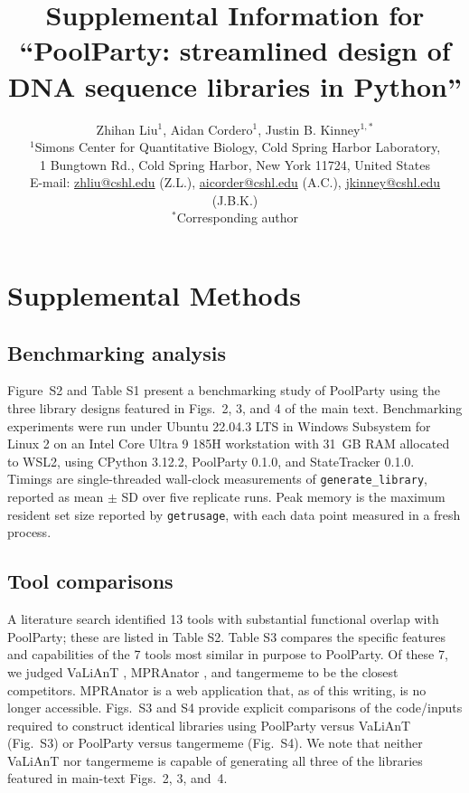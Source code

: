 \documentclass[11pt]{article}
\newif\ifshowquoted
\newcommand{\quoted}[1]{\ifshowquoted\textcolor{quotedtext}{#1}\else#1\fi}
\newcommand{\tocline}[1]{\addcontentsline{toc}{subsection}{#1}}
\begin{document}
\title{\textbf{Supplemental Information for ``PoolParty: streamlined design of DNA sequence libraries in Python''}}

\author{%
Zhihan Liu$^{1}$, Aidan Cordero$^{1}$, Justin B. Kinney$^{1,*}$\\[0.75em]
{\small $^{1}$Simons Center for Quantitative Biology, Cold Spring Harbor Laboratory,}\\
{\small 1 Bungtown Rd., Cold Spring Harbor, New York 11724, United States}\\[0.5em]
{\small E-mail: \href{mailto:zhliu@cshl.edu}{zhliu@cshl.edu} (Z.L.),
\href{mailto:aicorder@cshl.edu}{aicorder@cshl.edu} (A.C.),
\href{mailto:jkinney@cshl.edu}{jkinney@cshl.edu} (J.B.K.)}\\[0.5em]
{\small $^{*}$Corresponding author}%
}

\maketitle
\renewcommand{\contentsname}{Contents}
\tableofcontents
\clearpage

\tocline{\textbf{Supplemental Methods}}
\section*{Supplemental Methods}

\subsection*{Benchmarking analysis}
\quoted{Figure~S2 and Table S1 present a benchmarking study of PoolParty using the three library designs featured in Figs.~2, 3, and 4 of the main text. Benchmarking experiments were run under Ubuntu 22.04.3 LTS in Windows Subsystem for Linux 2 on an Intel Core Ultra 9 185H workstation with 31~GB RAM allocated to WSL2, using CPython 3.12.2, PoolParty 0.1.0, and StateTracker 0.1.0. Timings are single-threaded wall-clock measurements of \texttt{generate\_library}, reported as mean $\pm$ SD over five replicate runs. Peak memory is the maximum resident set size reported by \texttt{getrusage}, with each data point measured in a fresh process.}

\subsection*{Tool comparisons}
\quoted{A literature search identified 13 tools with substantial functional
overlap with PoolParty; these are listed in Table S2. Table
S3 compares the specific features and capabilities of the 7
tools most similar in purpose to PoolParty. Of these 7, we judged VaLiAnT
\citep{Barbon2022th}, MPRAnator \citep{GeorgakopoulosSoares2017gb}, and
tangermeme \citep{Schreiber2025nd} to be the closest competitors. MPRAnator is
a web application that, as of this writing, is no longer accessible.
Figs.~S3 and S4 provide
explicit comparisons of the code/inputs required to construct identical
libraries using PoolParty versus VaLiAnT (Fig.~S3) or
PoolParty versus tangermeme (Fig.~S4). We note that
neither VaLiAnT nor tangermeme is capable of generating all three of the
libraries featured in main-text Figs.~2, 3, and~4.}
\end{document}
